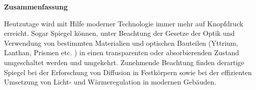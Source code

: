 \begin{center} \textbf{\Large Zusammenfassung} \end{center}
Heutzutage wird mit Hilfe moderner Technologie immer mehr auf Knopfdruck erreicht. Sogar Spiegel können, unter Beachtung der Gesetze der Optik und Verwendung von bestimmten Materialien und optischen Bauteilen (Yttrium, Lanthan, Prismen etc. ) in einen transparenten oder absorbierenden Zustand umgeschaltet werden und umgekehrt. Zunehmende Beachtung finden derartige Spiegel bei der Erforschung von Diffusion in Festkörpern sowie bei der effizienten Umsetzung von Licht- und Wärmeregulation in modernen Gebäuden.\\

